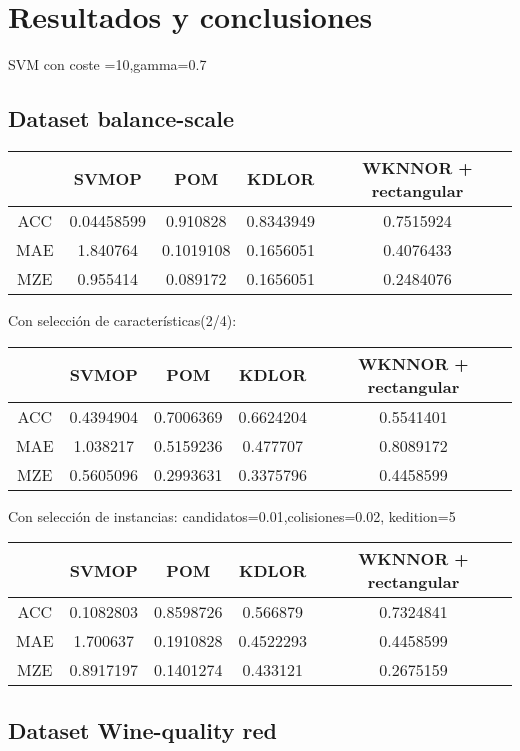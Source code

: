 \chapter{Resultados y conclusiones}
\label{conclusion}

SVM con coste =10,gamma=0.7
\section{Dataset balance-scale}
\begin{tabular}{ c c c c c }
	& SVMOP & POM & KDLOR & WKNNOR + rectangular \\
	\hline	
ACC &	0.04458599 & 0.910828 & 0.8343949 & 0.7515924\\
MAE &	1.840764 & 0.1019108 & 0.1656051 & 0.4076433\\
MZE &	0.955414 & 0.089172 & 0.1656051 & 0.2484076 \\
	\hline  
\end{tabular}

Con selección de características(2/4):

\begin{tabular}{ c c c c c }
	& SVMOP & POM & KDLOR & WKNNOR + rectangular \\
	\hline	
	ACC &	0.4394904 & 0.7006369 & 0.6624204  & 0.5541401 \\
	MAE &	1.038217 & 0.5159236 & 0.477707  & 0.8089172 \\
	MZE &	0.5605096 & 0.2993631 & 0.3375796  & 0.4458599  \\
	\hline  
\end{tabular}

Con selección de instancias:
candidatos=0.01,colisiones=0.02, kedition=5

\begin{tabular}{ c c c c c }
	& SVMOP & POM & KDLOR & WKNNOR + rectangular \\
	\hline	
	ACC &	0.1082803 & 0.8598726 & 0.566879  & 0.7324841 \\
	MAE &	1.700637 & 0.1910828 & 0.4522293  & 0.4458599 \\
	MZE &	0.8917197 & 0.1401274 & 0.433121  & 0.2675159  \\
	\hline  
\end{tabular}

\section{Dataset Wine-quality red}

